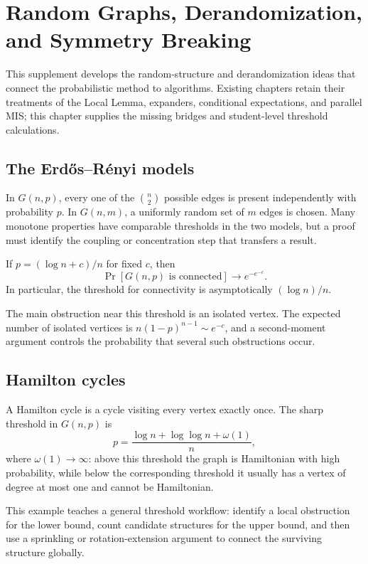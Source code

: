 \chapter{Random Graphs, Derandomization, and Symmetry Breaking}
\label{ch:stage5-random-graphs}

This supplement develops the random-structure and derandomization ideas that
connect the probabilistic method to algorithms.  Existing chapters retain
their treatments of the Local Lemma, expanders, conditional expectations, and
parallel MIS; this chapter supplies the missing bridges and student-level
threshold calculations.

\section{The Erd\H{o}s--R\'enyi models}

In $G(n,p)$, every one of the $\binom n2$ possible edges is present
independently with probability $p$.  In $G(n,m)$, a uniformly random set of
$m$ edges is chosen.  Many monotone properties have comparable thresholds in
the two models, but a proof must identify the coupling or concentration step
that transfers a result.

\begin{proposition}
If $p=(\log n+c)/n$ for fixed $c$, then
\[
 \Pr[G(n,p)\text{ is connected}]\longrightarrow e^{-e^{-c}}.
\]
In particular, the threshold for connectivity is asymptotically
$(\log n)/n$.
\end{proposition}

The main obstruction near this threshold is an isolated vertex.  The expected
number of isolated vertices is
$n(1-p)^{n-1}\sim e^{-c}$, and a second-moment argument controls the
probability that several such obstructions occur.

\section{Hamilton cycles}

A Hamilton cycle is a cycle visiting every vertex exactly once.  The sharp
threshold in $G(n,p)$ is
\[
 p=\frac{\log n+\log\log n+\omega(1)}{n},
\]
where $\omega(1)\to\infty$: above this threshold the graph is Hamiltonian
with high probability, while below the corresponding threshold it usually
has a vertex of degree at most one and cannot be Hamiltonian.

This example teaches a general threshold workflow: identify a local
obstruction for the lower bound, count candidate structures for the upper
bound, and then use a sprinkling or rotation-extension argument to connect
the surviving structure globally.

